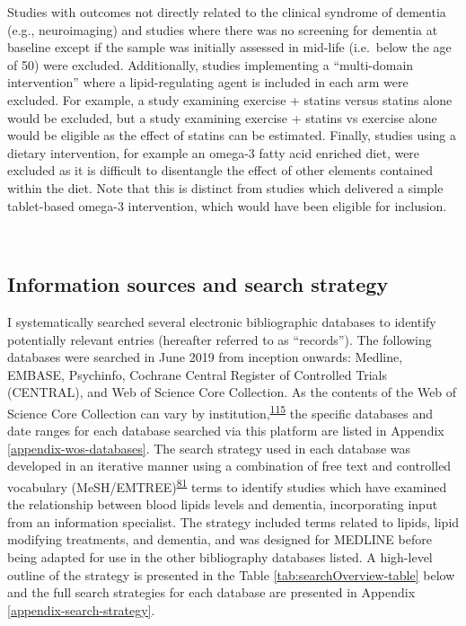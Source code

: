 \documentclass[a4paper, twoside]{templates/ociamthesis}
\begin{document}
Studies with outcomes not directly related to the clinical syndrome of dementia (e.g., neuroimaging) and studies where there was no screening for dementia at baseline except if the sample was initially assessed in mid-life (i.e.~below the age of 50) were excluded. Additionally, studies implementing a ``multi-domain intervention'' where a lipid-regulating agent is included in each arm were excluded. For example, a study examining exercise + statins versus statins alone would be excluded, but a study examining exercise + statins vs exercise alone would be eligible as the effect of statins can be estimated. Finally, studies using a dietary intervention, for example an omega-3 fatty acid enriched diet, were excluded as it is difficult to disentangle the effect of other elements contained within the diet. Note that this is distinct from studies which delivered a simple tablet-based omega-3 intervention, which would have been eligible for inclusion.

~

\hypertarget{information-sources-and-search-strategy}{%
\subsection{Information sources and search strategy}\label{information-sources-and-search-strategy}}

I systematically searched several electronic bibliographic databases to identify potentially relevant entries (hereafter referred to as ``records''). The following databases were searched in June 2019 from inception onwards: Medline, EMBASE, Psychinfo, Cochrane Central Register of Controlled Trials (CENTRAL), and Web of Science Core Collection. As the contents of the Web of Science Core Collection can vary by institution,\textsuperscript{\protect\hyperlink{ref-gusenbauer2020}{115}} the specific databases and date ranges for each database searched via this platform are listed in Appendix \ref{appendix-wos-databases}. The search strategy used in each database was developed in an iterative manner using a combination of free text and controlled vocabulary (MeSH/EMTREE)\textsuperscript{\protect\hyperlink{ref-lefebvre2019searching}{81}} terms to identify studies which have examined the relationship between blood lipids levels and dementia, incorporating input from an information specialist. The strategy included terms related to lipids, lipid modifying treatments, and dementia, and was designed for MEDLINE before being adapted for use in the other bibliography databases listed. A high-level outline of the strategy is presented in the Table \ref{tab:searchOverview-table} below and the full search strategies for each database are presented in Appendix \ref{appendix-search-strategy}.
\end{document}
